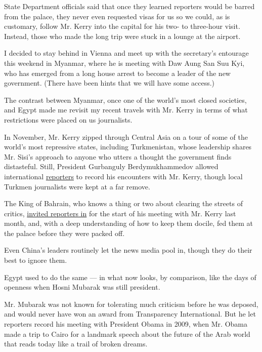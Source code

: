 State Department officials said that once they learned reporters would
be barred from the palace, they never even requested visas for us so we
could, as is customary, follow Mr. Kerry into the capital for his two-
to three-hour visit. Instead, those who made the long trip were stuck in
a lounge at the airport.

I decided to stay behind in Vienna and meet up with the secretary's
entourage this weekend in Myanmar, where he is meeting with Daw Aung San
Suu Kyi, who has emerged from a long house arrest to become a leader of
the new government. (There have been hints that we will have some
access.)

The contrast between Myanmar, once one of the world's most closed
societies, and Egypt made me revisit my recent travels with Mr. Kerry in
terms of what restrictions were placed on us journalists.

In November, Mr. Kerry zipped through Central Asia on a tour of some of
the world's most repressive states, including Turkmenistan, whose
leadership shares Mr. Sisi's approach to anyone who utters a thought the
government finds distasteful. Still, President Gurbanguly
Berdymukhammedov allowed international
\href{http://www.nytimes3xbfgragh.onion/2015/11/04/world/asia/john-kerry-confronts-human-rights-as-he-zips-through-central-asia.html?_r=0}{reporters}
to record his encounters with Mr. Kerry, though local Turkmen
journalists were kept at a far remove.

The King of Bahrain, who knows a thing or two about clearing the streets
of critics,
\href{http://www.nytimes3xbfgragh.onion/2016/04/08/world/middleeast/year-after-iran-nuclear-deal-kerry-confronts-concerns-of-arab-states.html}{invited
reporters in} for the start of his meeting with Mr. Kerry last month,
and, with a deep understanding of how to keep them docile, fed them at
the palace before they were packed off.

Even China's leaders routinely let the news media pool in, though they
do their best to ignore them.

Egypt used to do the same --- in what now looks, by comparison, like the
days of openness when Hosni Mubarak was still president.

Mr. Mubarak was not known for tolerating much criticism before he was
deposed, and would never have won an award from Transparency
International. But he let reporters record his meeting with President
Obama in 2009, when Mr. Obama made a trip to Cairo for a landmark speech
about the future of the Arab world that reads today like a trail of
broken dreams.

